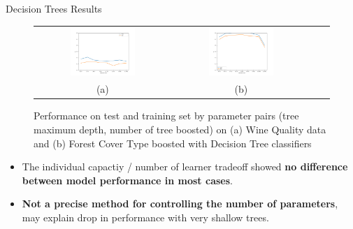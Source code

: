 \documentclass[final]{beamer}
\newlength{\onecolwid}
\newlength{\twocolwid}
\begin{document}
\begin{frame}[t]
\begin{columns}[t]
\begin{column}{\twocolwid}
\begin{columns}[t,totalwidth=\twocolwid]
\begin{column}{\onecolwid}
\begin{block}{Decision Trees Results}
\begin{figure} [H]
    \centering
    \begin{tabular}{cccc}
    \includegraphics[width=0.5\textwidth]{tree-wine-boosted_f1.png} &
    \includegraphics[width=0.5\textwidth]{tree-covtype_balanced-boosted_f1.png}\\
    (a) &
    (b)  \\[6pt]
    \end{tabular}
    \caption{Performance on test and training set by parameter pairs (tree maximum depth, number of tree boosted) on (a) Wine Quality data and (b) Forest Cover Type boosted with Decision Tree classifiers}
    \label{fig:Tree_results}
\end{figure}

\begin{itemize}
    \item The individual capactiy / number of learner tradeoff showed \textbf{no difference between model performance in most cases}.
    \item \textbf{Not a precise method for controlling the number of parameters}, may explain drop in performance with very shallow trees.
\end{itemize}

\end{block}
\end{column} %
\end{columns} %


\end{column}
\end{columns}
\end{frame}
\end{document}

